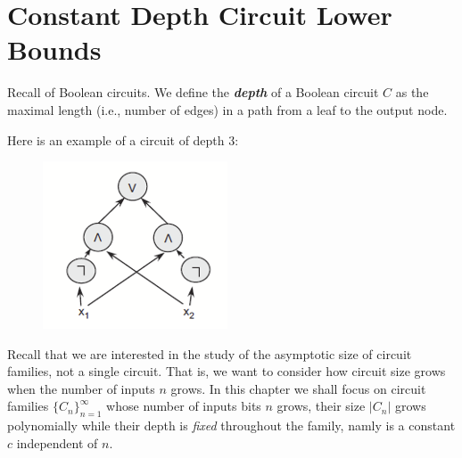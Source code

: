 %
%  
%
%










\chapter{Constant Depth Circuit Lower Bounds}
\label{hastad} %


Recall  of Boolean circuits.
We define the \emph{\textbf{depth}} of a Boolean circuit $C$ as 
the maximal length (i.e., number of edges) in a path from 
a leaf to the output node.

Here is an example of a circuit of depth 3:
\begin{figure}
    \centering
    \includegraphics[width=0.2\linewidth]{images/depth_3_circuit.png}
    \label{xxx}
\end{figure}

\newcommand{\complexityclass}[1]{\sf{#1}}
\newcommand{\ACZ}{\ensuremath{\complexityclass{AC}^0}}


Recall that we are interested in the  study of the asymptotic size of circuit families, not a single circuit. That is, we want to consider how circuit size grows when the number of inputs $n$ grows. In this chapter we shall focus on circuit families $\{C_n\}_{n=1}^\infty$
whose number of inputs bits $n$ grows, their size $|C_n|$ grows polynomially while their depth is \emph{fixed} throughout the family, namly is a constant $c$ independent of $n$. 


